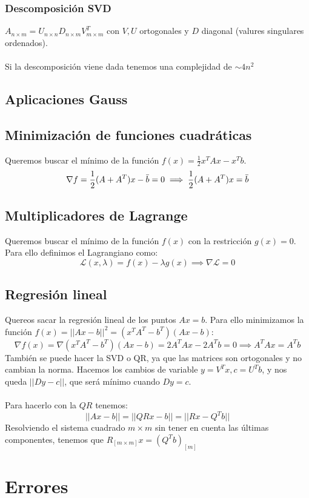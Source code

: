 \documentclass[leqno]{article}
\newcommand{\norm}[1]{\lvert \lvert #1 \rvert \rvert }
\begin{document}
\subsubsection{Descomposición SVD}
$A_{n \times m} = U_{n \times n}D_{n \times m}V^T_{m \times m}$ con $V, U$ ortogonales y $D$ diagonal (valures singulares ordenados). \\
\\
Si la descomposición viene dada tenemos una complejidad de $\sim 4n^2$

\subsection{Aplicaciones Gauss}
\subsection{Minimización de funciones cuadráticas}
Queremos buscar el mínimo de la función $f(x)=\frac{1}{2}x^TAx - x^Tb$.
\[\nabla f = \frac{1}{2}(A+A^T)x-\Bar{b} = 0 \implies \frac{1}{2}(A+A^T)x = \Bar{b}\]

\subsection{Multiplicadores de Lagrange}
Queremos buscar el mínimo de la función $f(x)$ con la restricción $g(x)=0$. Para ello definimos el Lagrangiano como:
\[\mathcal{L}(x, \lambda)=f(x)-\lambda g(x) \implies \nabla \mathcal{L} = 0\]

\subsection{Regresión lineal}
Quereos sacar la regresión lineal de los puntos $Ax=b$. Para ello minimizamos la función $f(x)=||Ax-b||^2 = (x^TA^T-b^T)(Ax-b)$:
\[\nabla f(x)=\nabla (x^TA^T-b^T)(Ax-b) = 2A^TAx - 2A^Tb = 0 \implies A^TAx = A^Tb\]
También se puede hacer la SVD o QR, ya que las matrices son ortogonales y no cambian la norma. Hacemos los cambios de variable $y = V^Tx, c=U^Tb$, y nos queda $\norm{Dy-c}$, que será mínimo cuando $Dy=c$. \\
\\
Para hacerlo con la $QR$ tenemos:
$$
\norm{Ax-b} = \norm{QRx-b} = \norm{Rx-Q^Tb}
$$
Resolviendo el sistema cuadrado $m\times m $ sin tener en cuenta las últimas componentes, tenemos que $R_{[m\times m]}x = (Q^Tb)_{[m]}$

\section{Errores}
\end{document}
